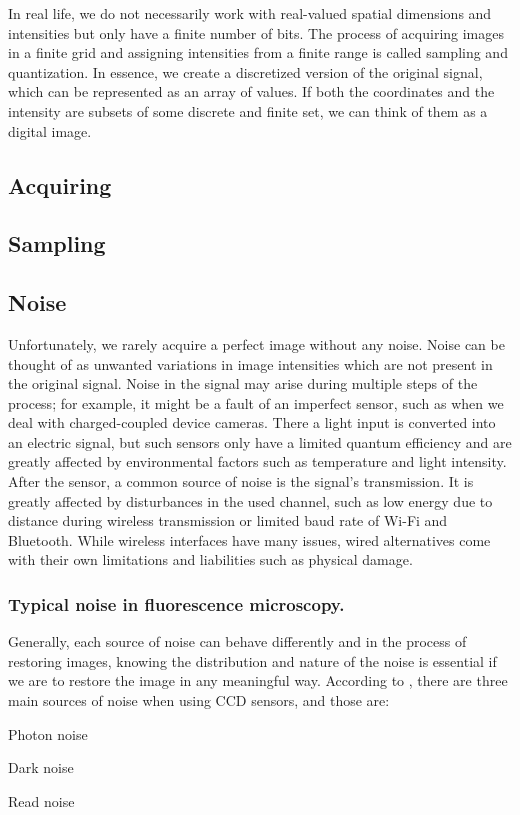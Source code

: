 \documentclass[
  digital,     %
  oneside,     %
  nosansbold,  %
  nocolorbold, %
  lof,         %
  lot,         %
]{fithesis4}
\begin{document}
In real life, we do not necessarily work with real-valued spatial dimensions and
intensities but only have a finite number of bits. The process of
acquiring images in a finite grid and assigning intensities from a finite
range is called sampling and quantization. In essence, we create a discretized
version of the original signal, which can be represented as an array of values.
If both the coordinates and the intensity are subsets of some discrete and finite set,
we can think of them as a digital image.

\subsection{Acquiring}

\subsection{Sampling}

\subsection{Noise}

Unfortunately, we rarely acquire a perfect image without any noise. Noise
can be thought of as unwanted variations in image intensities which are not
present in the original signal. Noise in the signal may arise during multiple
steps of the process; for example, it might be a fault of an imperfect sensor,
such as when we deal with charged-coupled device cameras. There a light input is
converted into an electric signal, but such sensors only have a limited quantum
efficiency and are greatly affected by environmental factors such as
temperature and light intensity. After the sensor, a common source of noise is
the signal's transmission. It is greatly affected by disturbances in the used
channel, such as low energy due to distance during wireless transmission or
limited baud rate of Wi-Fi and Bluetooth. While wireless interfaces have many
issues, wired alternatives come with their own limitations and liabilities such as physical damage.

\subsubsection{Typical noise in fluorescence microscopy.}

Generally, each source of noise can behave differently and in the process of restoring
images, knowing the distribution and nature of the noise is essential if we are to restore the
image in any meaningful way. According to \parencite{hamamatsu_ccd}, there are three main sources of noise when using CCD sensors, and those are:
\begin{compactenum}
\item Photon noise
\item Dark noise
\item Read noise
\end{compactenum}
\end{document}
